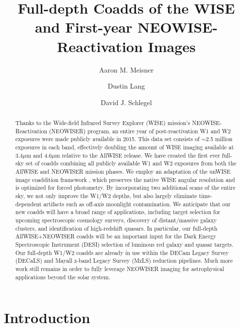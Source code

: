 \documentclass{emulateapj}
\begin{document}
 
\title{Full-depth Coadds of the WISE and First-year NEOWISE-Reactivation Images}

\author{Aaron M. Meisner}
\author{Dustin Lang}
\author{David J. Schlegel}


\begin{abstract} 
Thanks to the Wide-field Infrared Survey Explorer (WISE) mission's
NEOWISE-Reactivation (NEOWISER) program, an entire year of post-reactivation W1
and W2 exposures were made publicly available in 2015. This data set consists of
$\sim$2.5 million exposures in each band, effectively doubling the amount
of WISE imaging available at 3.4$\mu$m and 4.6$\mu$m relative to the AllWISE
release. We have created the first ever full-sky set of coadds combining all 
publicly available W1 and W2 exposures from both the AllWISE and 
NEOWISER mission phases. We employ an adaptation of the unWISE image coaddition
framework \citep{lang14}, which preserves the native WISE angular resolution 
and is optimized for forced photometry. By incorporating two additional scans
of the entire sky, we not only improve the W1/W2 depths, but also largely
eliminate time-dependent artifacts such as off-axis moonlight contamination.
We anticipate that our new coadds will have a broad range of 
applications, including target selection for upcoming spectroscopic cosmology 
surveys, discovery of distant/massive galaxy clusters, and 
identification of high-redshift quasars. In particular, our full-depth 
AllWISE+NEOWISER coadds will be an important input for the Dark Energy 
Spectroscopic Instrument (DESI) selection of luminous red galaxy and quasar 
targets. Our full-depth W1/W2 coadds are already in use within the 
DECam Legacy Survey (DECaLS) and Mayall z-band Legacy Survey (MzLS) reduction 
pipelines. Much more work still remains in order to fully leverage NEOWISER 
imaging for astrophysical applications beyond the solar system.
\end{abstract}  
 

\section{Introduction}
\end{document}
